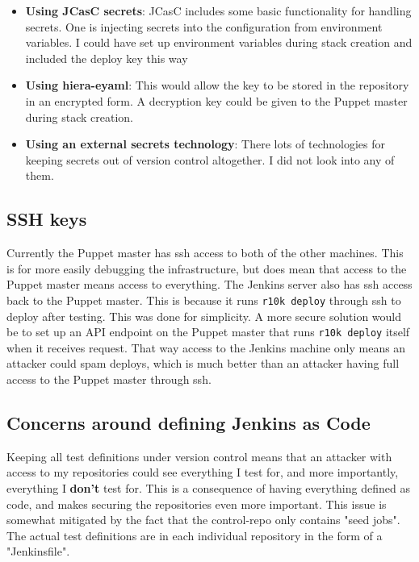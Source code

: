 \begin{itemize}  
\item \textbf{Using JCasC secrets}: JCasC includes some basic functionality for handling secrets. One is injecting secrets into the configuration from environment variables. I could have set up environment variables during stack creation and included the deploy key this way
\item \textbf{Using hiera-eyaml}: This would allow the key to be stored in the repository in an encrypted form. A decryption key could be given to the Puppet master during stack creation.
\item \textbf{Using an external secrets technology}: There lots of technologies for keeping secrets out of version control altogether. I did not look into any of them.
\end{itemize}

\subsection{SSH keys}

Currently the Puppet master has ssh access to both of the other machines. This is for more easily debugging the infrastructure, but does mean that access to the Puppet master means access to everything. The Jenkins server also has ssh access back to the Puppet master. This is because it runs \texttt{r10k deploy} through ssh to deploy after testing. This was done for simplicity. A more secure solution would be to set up an API endpoint on the Puppet master that runs \texttt{r10k deploy} itself when it receives request. That way access to the Jenkins machine only means an attacker could spam deploys, which is much better than an attacker having full access to the Puppet master through ssh.

\subsection{Concerns around defining Jenkins as Code}

Keeping all test definitions under version control means that an attacker with access to my repositories could see everything I test for, and more importantly, everything I \textbf{don't} test for. This is a consequence of having everything defined as code, and makes securing the repositories even more important. This issue is somewhat mitigated by the fact that the control-repo only contains "seed jobs". The actual test definitions are in each individual repository in the form of a "Jenkinsfile".



